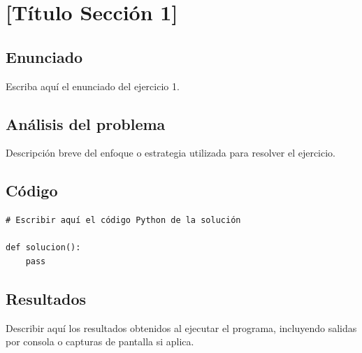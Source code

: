 
\section{[Título Sección 1]}

\subsection*{Enunciado}

\begin{tcolorbox}[colback=gray!8, colframe=gray!50, title=Ejercicio 1]
    Escriba aquí el enunciado del ejercicio 1.
\end{tcolorbox}

\subsection{Análisis del problema}

Descripción breve del enfoque o estrategia utilizada para resolver el ejercicio.

\subsection{Código}

\begin{lstlisting}[caption={Solución ejercicio 1}, label={lst:ej1}]
# Escribir aquí el código Python de la solución

def solucion():
    pass
\end{lstlisting}

\subsection{Resultados}

\begin{respuesta}
    Describir aquí los resultados obtenidos al ejecutar el programa,
    incluyendo salidas por consola o capturas de pantalla si aplica.
\end{respuesta}


\newpage
